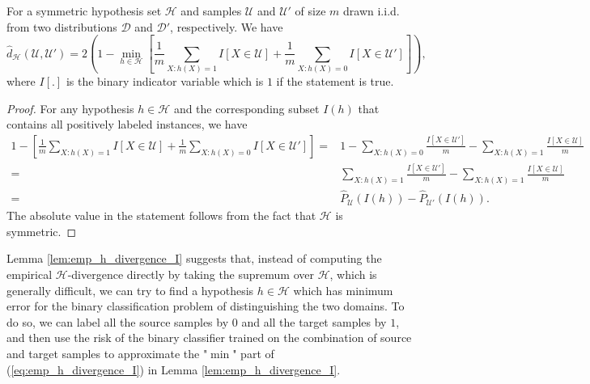 \begin{lemma}\label{lem:emp_h_divergence_I}
  For a symmetric hypothesis set $\mathcal{H}$ and samples $\mathcal{U}$ and $\mathcal{U}'$ of size $m$ drawn i.i.d. from two distributions $\mathcal{D}$ and $\mathcal{D}'$, respectively. We have
  \begin{equation}\label{eq:emp_h_divergence_I}
    \hat{d}_{\mathcal{H}}(\mathcal{U}, \mathcal{U}')=2 \left( 1-\min_{h \in \mathcal{H}} \left[ \frac{1}{m} \sum_{X:h(X)=1}I[X \in \mathcal{U}]+\frac{1}{m} \sum_{X:h(X)=0}I[X \in \mathcal{U}'] \right] \right),
  \end{equation}
  where $I[.]$ is the binary indicator variable which is $1$ if the statement is true.
\end{lemma}
\begin{proof}
  For any hypothesis $h \in \mathcal{H}$ and the corresponding subset $I(h)$ that contains all positively labeled instances, we have
  \begin{align}
    1 - \left[ \frac{1}{m} \sum_{X:h(X)=1}I[X \in \mathcal{U}]+\frac{1}{m} \sum_{X:h(X)=0}I[X \in \mathcal{U}'] \right]
    =& 1 - \sum_{X:h(X)=0} \frac{I[X \in \mathcal{U}']}{m} - \sum_{X:h(X)=1} \frac{I[X \in \mathcal{U}]}{m} \label{eq:emp_h_divergence_I_pf_1}\\
    =& \sum_{X:h(X)=1} \frac{I[X \in \mathcal{U}']}{m} - \sum_{X:h(X)=1} \frac{I[X \in \mathcal{U}]}{m} \label{eq:emp_h_divergence_I_pf_2}\\
    =& \hat{P}_{\mathcal{U}}(I(h)) - \hat{P}_{\mathcal{U}'}(I(h)). \label{eq:emp_h_divergence_I_pf_3}
  \end{align}
  The absolute value in the statement follows from the fact that $\mathcal{H}$ is symmetric.
\end{proof}

Lemma \ref{lem:emp_h_divergence_I} suggests that, instead of computing the empirical $\mathcal{H}$-divergence directly by taking the supremum over $\mathcal{H}$, which is generally difficult, we can try to find a hypothesis $h \in \mathcal{H}$ which has minimum error for the binary classification problem of distinguishing the two domains. To do so, we can label all the source samples by $0$ and all the target samples by $1$, and then use the risk of the binary classifier trained on the combination of source and target samples to approximate the "$\min$" part of (\ref{eq:emp_h_divergence_I}) in Lemma \ref{lem:emp_h_divergence_I}.

